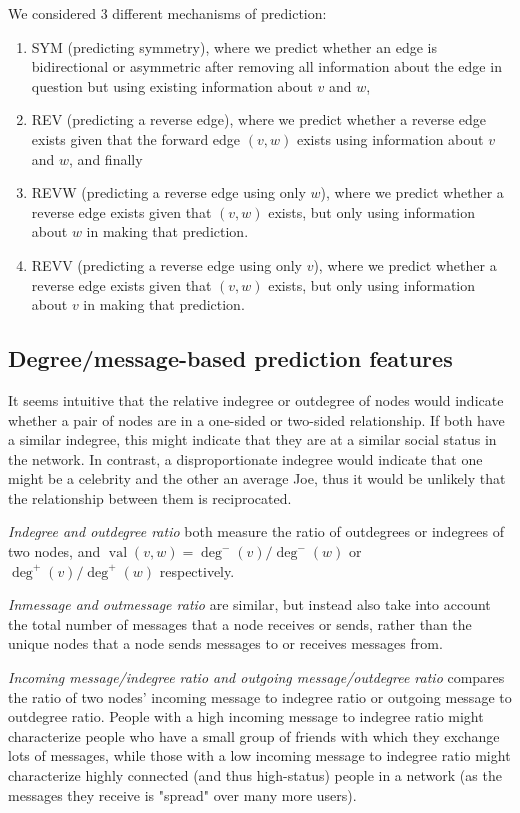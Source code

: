 \documentclass[conference]{IEEEtran}
\begin{document}
We considered 3 different mechanisms of prediction: 
\begin{enumerate}
\item SYM (predicting symmetry), where we predict whether an edge is bidirectional or asymmetric after removing all information about the edge in question but using existing information about $v$ and $w$, 
\item REV (predicting a reverse edge), where we predict whether a reverse edge exists given that the forward edge $(v,w)$ exists using information about $v$ and $w$, and finally 
\item REVW (predicting a reverse edge using only $w$), where we predict whether a reverse edge exists given that $(v,w)$ exists, but only using information about $w$ in making that prediction.
\item REVV (predicting a reverse edge using only $v$), where we predict whether a reverse edge exists given that $(v,w)$ exists, but only using information about $v$ in making that prediction.
\end{enumerate}

\subsection{Degree/message-based prediction features}
It seems intuitive that the relative indegree or outdegree of nodes would indicate whether a pair of nodes are in a one-sided or two-sided relationship. If both have a similar indegree, this might indicate that they are at a similar social status in the network. In contrast, a disproportionate indegree would indicate that one might be a celebrity and the other an average Joe, thus it would be unlikely that the relationship between them is reciprocated.

\emph{Indegree and outdegree ratio} both measure the ratio of outdegrees or indegrees of two nodes, and $\operatorname{val}(v,w) = \deg^-(v)/\deg^-(w)$ or $\deg^+(v)/\deg^+(w)$ respectively.

\emph{Inmessage and outmessage ratio} are similar, but instead also take into account the total number of messages that a node receives or sends, rather than the unique nodes that a node sends messages to or receives messages from.

\emph{Incoming message/indegree ratio and outgoing message/outdegree ratio} compares the ratio of two nodes' incoming message to indegree ratio or outgoing message to outdegree ratio. People with a high incoming message to indegree ratio might characterize people who have a small group of friends with which they exchange lots of messages, while those with a low incoming message to indegree ratio might characterize highly connected (and thus high-status) people in a network (as the messages they receive is "spread" over many more users).
\end{document}
